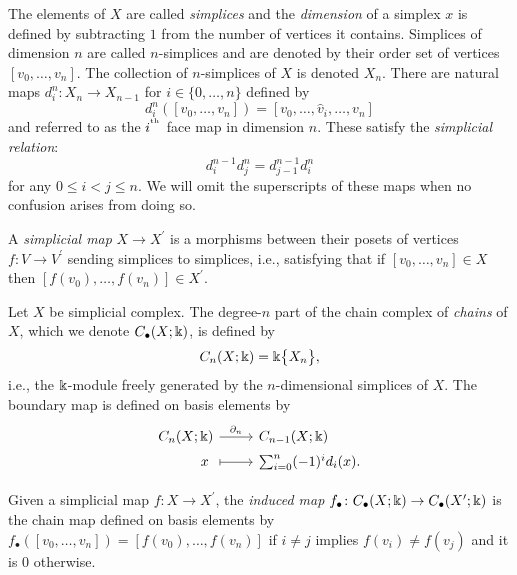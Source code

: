 The elements of $X$ are called \textit{simplices} and the \textit{dimension} of a simplex $x$ is defined by subtracting $1$ from the number of vertices it contains.
Simplices of dimension $n$ are called $n$-simplices and are denoted by their order set of vertices $[v_0, \dots, v_n]$.
The collection of $n$-simplices of $X$ is denoted $X_n$.
There are natural maps $d_i^n \colon X_n \to X_{n-1}$ for $i \in \{0, \dots, n\}$ defined by
\begin{equation*}
d_i^n([v_0, \dots, v_n]) = [v_0, \dots, \widehat{v}_i, \dots, v_n]
\end{equation*}
and referred to as the $i^{^\mathrm{th}}$ face map in dimension $n$.
These satisfy the \textit{simplicial relation}:
\begin{equation} \label{e:simplicial relation}
d_i^{n-1} d^n_j = d_{j-1}^{n-1} d_i^n
\end{equation}
for any $0 \leq i < j \leq n$.
We will omit the superscripts of these maps when no confusion arises from doing so.

A \textit{simplicial map} $X \to X^\prime$ is a morphisms between their posets of vertices $f \colon V \to V^\prime$ sending simplices to simplices, i.e., satisfying that if $[v_0, \dots, v_n] \in X$ then $[f(v_0), \dots, f(v_n)] \in X^\prime$.

Let $X$ be simplicial complex.
The degree-$n$ part of the chain complex of \textit{chains} of $X$, which we denote $C_\bullet(X; \Bbbk)$, is defined by
\begin{equation*}
C_n(X; \Bbbk) = \Bbbk \big\{ X_n \big\},
\end{equation*}
i.e., the $\Bbbk$-module freely generated by the $n$-dimensional simplices of $X$.
The boundary map is defined on basis elements by
\begin{equation*}
\begin{tikzcd}[column sep=normal, row sep=tiny,row sep = 0ex
,/tikz/column 1/.append style={anchor=base east}
,/tikz/column 2/.append style={anchor=base west}
]
C_n(X; \k) \arrow[r, "\partial_n"] & C_{n-1}(X; \k) \\
x\ \arrow[r, |->] & \sum_{i=0}^{n} (-1)^i d_i (x).
\end{tikzcd}
\end{equation*}

Given a simplicial map $f \colon X \to X^\prime$, the \textit{induced map} $f_\bullet \colon C_\bullet(X; \Bbbk) \to C_\bullet(X^\prime; \Bbbk)$ is the chain map defined on basis elements by $f_\bullet([v_0, \dots, v_n]) = [f(v_0), \dots, f(v_n)]$ if $i \neq j$ implies $ f(v_i) \neq f(v_j)$ and it is $0$ otherwise.

